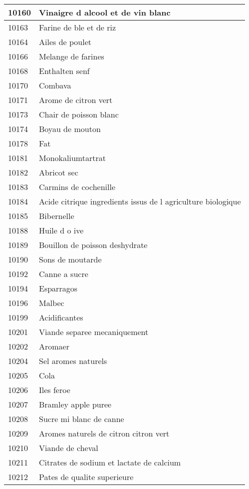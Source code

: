 \begin{longtable}{|l|l|}
10160 & Vinaigre d alcool et de vin blanc \\ \hline 
10163 & Farine de ble et de riz \\ \hline 
10164 & Ailes de poulet \\ \hline 
10166 & Melange de farines \\ \hline 
10168 & Enthalten senf \\ \hline 
10170 & Combava \\ \hline 
10171 & Arome de citron vert \\ \hline 
10173 & Chair de poisson blanc \\ \hline 
10174 & Boyau de mouton \\ \hline 
10178 & Fat \\ \hline 
10181 & Monokaliumtartrat \\ \hline 
10182 & Abricot sec \\ \hline 
10183 & Carmins de cochenille \\ \hline 
10184 & Acide citrique ingredients issus de l agriculture biologique \\ \hline 
10185 & Bibernelle \\ \hline 
10188 & Huile d o ive \\ \hline 
10189 & Bouillon de poisson deshydrate \\ \hline 
10190 & Sons de moutarde \\ \hline 
10192 & Canne a sucre \\ \hline 
10194 & Esparragos \\ \hline 
10196 & Malbec \\ \hline 
10199 & Acidificantes \\ \hline 
10201 & Viande separee mecaniquement \\ \hline 
10202 & Aromaer \\ \hline 
10204 & Sel aromes naturels \\ \hline 
10205 & Cola \\ \hline 
10206 & Iles feroe \\ \hline 
10207 & Bramley apple puree \\ \hline 
10208 & Sucre mi blanc de canne \\ \hline 
10209 & Aromes naturels de citron citron vert \\ \hline 
10210 & Viande de cheval \\ \hline 
10211 & Citrates de sodium et lactate de calcium \\ \hline 
10212 & Pates de qualite superieure \\ \hline 

\end{longtable}
